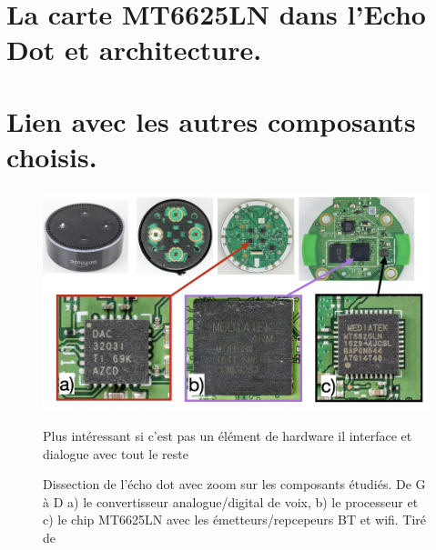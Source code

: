 \documentclass[12pt,svgnames]{article}
\begin{document}




\section{La carte MT6625LN dans l'Echo Dot et architecture.}


\section{Lien avec les autres composants choisis.}

\begin{figure}[h!]
\begin{center}
\includegraphics[width=\textwidth]{fig/echo-dot-inside}
\caption{Dissection de l'écho dot avec zoom sur les composants étudiés. De G à D a) le convertisseur analogue/digital de voix, b) le processeur et c) le chip MT6625LN avec les émetteurs/repcepeurs BT et wifi. Tiré de \cite{wikimedia-echo-dot}}
\label{fig:gain-var}

Plus intéressant si c'est pas un élément de hardware il interface et dialogue avec tout le reste
\end{center}
\end{figure}
\end{document}
